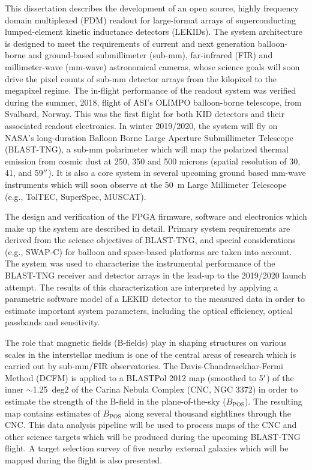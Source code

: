 This dissertation describes the development of an open source, highly frequency domain multiplexed (FDM) readout for large-format arrays of superconducting lumped-element kinetic inductance detectors (LEKIDs). The system architecture is designed to meet the requirements of current and next generation balloon-borne and ground-based submillimeter (sub-mm), far-infrared (FIR) and millimeter-wave (mm-wave) astronomical cameras, whose science goals will soon drive the pixel counts of sub-mm detector arrays from the kilopixel to the megapixel regime. The in-flight performance of the readout system was verified during the summer, 2018, flight of ASI's OLIMPO balloon-borne telescope, from Svalbard, Norway. This was the first flight for both KID detectors and their associated readout electronics. In winter 2019/2020, the system will fly on NASA's long-duration Balloon Borne Large Aperture Submillimeter Telescope (BLAST-TNG), a sub-mm polarimeter which will map the polarized thermal emission from cosmic dust at 250, 350 and 500 microns (spatial resolution of 30, 41, and 59$\operatorname{^{\prime\prime}}$). It is also a core system in several upcoming ground based mm-wave instruments which will soon observe at the 50~m Large Millimeter Telescope (e.g., TolTEC, SuperSpec, MUSCAT).

The design and verification of the FPGA firmware, software and electronics which make up the system are described in detail. Primary system requirements are derived from the science objectives of BLAST-TNG, and special considerations (e.g., SWAP-C) for balloon and space-based platforms are taken into account. The system was used to characterize the instrumental performance of the BLAST-TNG receiver and detector arrays in the lead-up to the 2019/2020 launch attempt. The results of this characterization are interpreted by applying a parametric software model of a LEKID detector to the measured data in order to estimate important system parameters, including the optical efficiency, optical passbands and sensitivity.

The role that magnetic fields (B-fields) play in shaping structures on various scales in the interstellar medium is one of the central areas of research which is carried out by sub-mm/FIR observatories. The Davis-Chandrasekhar-Fermi Method (DCFM) is applied to a BLASTPol 2012 map (smoothed to 5$\operatorname{^{\prime}}$) of the inner $\sim$1.25~deg${2}$ of the Carina Nebula Complex (CNC, NGC 3372) in order to estimate the strength of the B-field in the plane-of-the-sky ($B_{\mathrm{POS}}$). The resulting map contains estimates of $B_{\mathrm{POS}}$ along several thousand sightlines through the CNC. This data analysis pipeline will be used to process maps of the CNC and other science targets which will be produced during the upcoming BLAST-TNG flight. A target selection survey of five nearby external galaxies which will be mapped during the flight is also presented.

